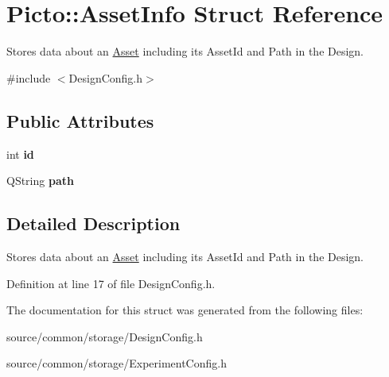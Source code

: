 \hypertarget{struct_picto_1_1_asset_info}{\section{Picto\-:\-:Asset\-Info Struct Reference}
\label{struct_picto_1_1_asset_info}
}


Stores data about an \hyperlink{class_picto_1_1_asset}{Asset} including its Asset\-Id and Path in the Design.  




{\ttfamily \#include $<$Design\-Config.\-h$>$}

\subsection*{Public Attributes}
\begin{DoxyCompactItemize}
\item 
\hypertarget{struct_picto_1_1_asset_info_a16aea8eb5d4264cc3b7670272ce1f27c}{int {\bfseries id}}\label{struct_picto_1_1_asset_info_a16aea8eb5d4264cc3b7670272ce1f27c}

\item 
\hypertarget{struct_picto_1_1_asset_info_ad0ed02a970f66209317e1c10fcb35de4}{Q\-String {\bfseries path}}\label{struct_picto_1_1_asset_info_ad0ed02a970f66209317e1c10fcb35de4}

\end{DoxyCompactItemize}


\subsection{Detailed Description}
Stores data about an \hyperlink{class_picto_1_1_asset}{Asset} including its Asset\-Id and Path in the Design. 

Definition at line 17 of file Design\-Config.\-h.



The documentation for this struct was generated from the following files\-:\begin{DoxyCompactItemize}
\item 
source/common/storage/Design\-Config.\-h\item 
source/common/storage/Experiment\-Config.\-h\end{DoxyCompactItemize}
